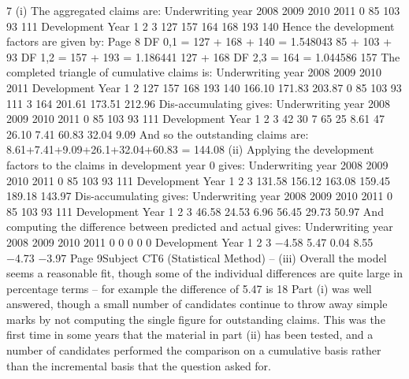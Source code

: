 \documentclass[a4paper,12pt]{article}
\begin{document}
7
(i)
The aggregated claims are:
Underwriting year
2008
2009
2010
2011
0
85
103
93
111
Development Year
1
2
3
127 157 164
168 193
140
Hence the development factors are given by:
Page 8
DF 0,1 = 127 + 168 + 140
= 1.548043
85 + 103 + 93
DF 1,2 = 157 + 193
= 1.186441
127 + 168
DF 2,3 = 164
= 1.044586
157%
The completed triangle of cumulative claims is:
Underwriting
year
2008
2009
2010
2011
Development Year
1
2
127
157
168
193
140
166.10
171.83
203.87
0
85
103
93
111
3
164
201.61
173.51
212.96
Dis-accumulating gives:
Underwriting year
2008
2009
2010
2011
0
85
103
93
111
Development Year
1
2
3
42
30
7
65
25
8.61
47
26.10 7.41
60.83 32.04 9.09
And so the outstanding claims are:
8.61+7.41+9.09+26.1+32.04+60.83 = 144.08
(ii)
Applying the development factors to the claims in development year 0 gives:
Underwriting year
2008
2009
2010
2011
0
85
103
93
111
Development Year
1
2
3
131.58 156.12 163.08
159.45 189.18
143.97
Dis-accumulating gives:
Underwriting year
2008
2009
2010
2011
0
85
103
93
111
Development Year
1
2
3
46.58 24.53 6.96
56.45 29.73
50.97
And computing the difference between predicted and actual gives:
Underwriting year
2008
2009
2010
2011
0
0
0
0
0
Development Year
1
2
3
−4.58
5.47 0.04
8.55 −4.73
−3.97
Page 9Subject CT6 (Statistical Method) – %
(iii)
Overall the model seems a reasonable fit, though some of the individual
differences are quite large in percentage terms – for example the difference of
5.47 is 18%
Part (i) was well answered, though a small number of candidates continue to throw away
simple marks by not computing the single figure for outstanding claims. This was the first
time in some years that the material in part (ii) has been tested, and a number of candidates
performed the comparison on a cumulative basis rather than the incremental basis that the
question asked for.
\end{document}
